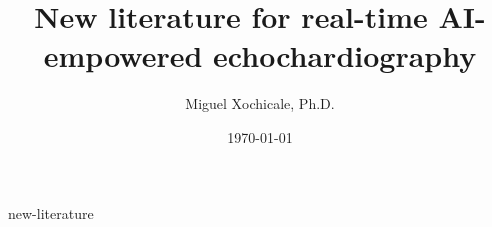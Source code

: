 \documentclass[12pt]{article}
\title{New literature for real-time AI-empowered echochardiography}
\author{
Miguel Xochicale, Ph.D.
}
\date{
\today
}
\begin{document}
\maketitle
\thispagestyle{empty} %

\tableofcontents
{new-literature}

%


\end{document}
